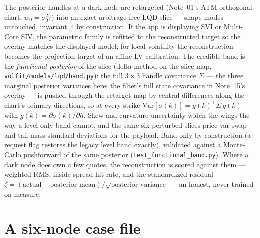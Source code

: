 \documentclass[11pt]{article}
\begin{document}
The posterior handles at a dark node are retargeted (Note~01's ATM-orthogonal
chart, $w_0=\sigma_0^2\tau$) into an exact arbitrage-free LQD slice --- shape
modes untouched, invariant~4 by construction. If the app is displaying SVI or
Multi-Core SIV, the parametric family is refitted to the reconstructed target so
the overlay matches the displayed model; for local volatility the reconstruction
becomes the projection target of an affine LV calibration. The credible band is
the \emph{functional posterior} of the slice (delta method on the slice map,
\texttt{volfit/models/lqd/band.py}): the full $3\times3$ handle covariance
$\Sigma$ --- the three marginal posterior variances here; the filter's full
state covariance in Note~15's overlay --- is pushed through the retarget map by
central differences along the chart's primary directions, so at every strike
$\mathrm{Var}[\sigma(k)]=g(k)^{\!\top}\Sigma\,g(k)$ with
$g(k)=\partial\sigma(k)/\partial h$. Skew and curvature uncertainty widen the
wings the way a level-only band cannot, and the same six perturbed slices price
var-swap and tail-mass standard deviations for the payload. Band-only by
construction (a request flag restores the legacy level band exactly), validated
against a Monte-Carlo pushforward of the same posterior
(\texttt{test\_functional\_band.py}). Where a dark node does
own a few quotes, the reconstruction is scored against them --- weighted RMS,
inside-spread hit rate, and the standardized residual
$\zeta=(\text{actual}-\text{posterior mean})/\sqrt{\text{posterior variance}}$
--- an honest, never-trained-on measure.

\section{A six-node case file}
\label{sec:case}
\end{document}
